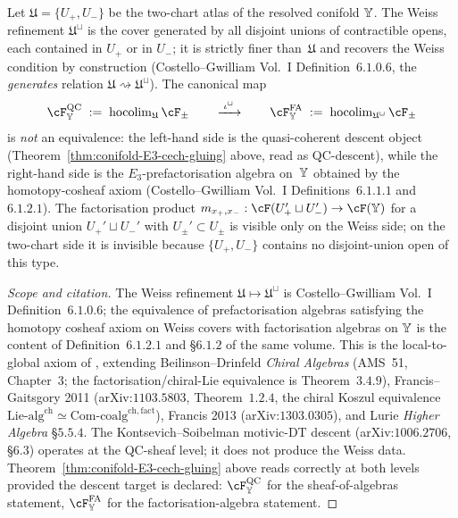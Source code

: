 \begin{proposition}
\label{prop:conifold-weiss-refinement}
Let $\mathfrak U = \{U_+, U_-\}$ be the two-chart atlas of the resolved conifold $\mathbb{Y}$. The Weiss refinement $\mathfrak U^\sqcup$ is the cover generated by all disjoint unions of contractible opens, each contained in $U_+$ or in $U_-$; it is strictly finer than~$\mathfrak U$ and recovers the Weiss condition by construction (Costello--Gwilliam Vol.~I Definition~$6.1.0.6$, the \emph{generates} relation $\mathfrak U \rightsquigarrow \mathfrak U^\sqcup$). The canonical map
\[
 \cF_{\bY}^{\mathrm{QC}} \;:=\; \mathrm{hocolim}_{\mathfrak U}\, \cF_\pm
 \qquad\xrightarrow{\;\iota^\sqcup\;}\qquad
 \cF_{\bY}^{\mathrm{FA}} \;:=\; \mathrm{hocolim}_{\mathfrak U^\sqcup}\, \cF_\pm
\]
is \emph{not} an equivalence: the left-hand side is the quasi-coherent descent object (Theorem~\ref{thm:conifold-E3-cech-gluing} above, read as QC-descent), while the right-hand side is the $E_3$-prefactorisation algebra on~$\mathbb{Y}$ obtained by the homotopy-cosheaf axiom (Costello--Gwilliam Vol.~I Definitions~$6.1.1.1$ and~$6.1.2.1$). The factorisation product $m_{x_+, x_-} : \cF(U_+' \sqcup U_-') \to \cF(\bY)$ for a disjoint union $U_+' \sqcup U_-'$ with $U_\pm' \subset U_\pm$ is visible only on the Weiss side; on the two-chart side it is invisible because $\{U_+, U_-\}$ contains no disjoint-union open of this type.
\end{proposition}

\begin{proof}[Scope and citation]
The Weiss refinement $\mathfrak U \mapsto \mathfrak U^\sqcup$ is Costello--Gwilliam Vol.~I Definition~$6.1.0.6$; the equivalence of prefactorisation algebras satisfying the homotopy cosheaf axiom on Weiss covers with factorisation algebras on $\mathbb{Y}$ is the content of Definition~$6.1.2.1$ and \S$6.1.2$ of the same volume. This is the local-to-global axiom of \cite[\S 6.1.1--6.1.2]{CostelloGwilliam}, extending Beilinson--Drinfeld \emph{Chiral Algebras} (AMS~51, Chapter~$3$; the factorisation/chiral-Lie equivalence is Theorem~$3.4.9$), Francis--Gaitsgory 2011 (arXiv:$1103.5803$, Theorem~$1.2.4$, the chiral Koszul equivalence $\mathrm{Lie}\text{-alg}^{\mathrm{ch}} \simeq \mathrm{Com}\text{-coalg}^{\mathrm{ch,fact}}$), Francis 2013 (arXiv:$1303.0305$), and Lurie \emph{Higher Algebra} §$5.5.4$. The Kontsevich--Soibelman motivic-DT descent (arXiv:$1006.2706$, §$6.3$) operates at the QC-sheaf level; it does not produce the Weiss data. Theorem~\ref{thm:conifold-E3-cech-gluing} above reads correctly at both levels provided the descent target is declared: $\cF_{\bY}^{\mathrm{QC}}$ for the sheaf-of-algebras statement, $\cF_{\bY}^{\mathrm{FA}}$ for the factorisation-algebra statement.
\end{proof}

